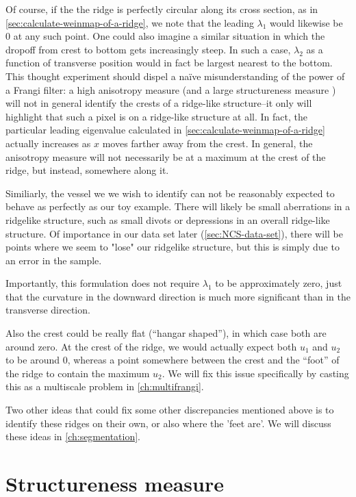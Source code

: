 Of course, if the the ridge is perfectly circular along its cross section, as in \cref{sec:calculate-weinmap-of-a-ridge}, we note that the leading  $\lambda_1$ would likewise be 0 at any such point.  One could also imagine a similar situation in which the dropoff from crest to bottom gets increasingly steep. In such a case, $\lambda_2$ as a function of transverse position would in fact be largest nearest to the bottom. This thought experiment should dispel a na\"{i}ve misunderstanding of the power of a Frangi filter: a high anisotropy measure (and a large structureness measure ) will not in general identify the crests of a ridge-like structure--it only will highlight that such a pixel is on a ridge-like structure at all. In fact, the particular leading eigenvalue calculated in \cref{sec:calculate-weinmap-of-a-ridge} actually increases as $x$ moves farther away from the crest. In general, the anisotropy measure will not necessarily be at a maximum at the crest of the ridge, but instead, somewhere along it.

Similiarly, the vessel we we wish to identify can not be reasonably expected to behave as perfectly as our toy example. There will likely be small aberrations in a ridgelike structure, such as small divots or depressions in an overall ridge-like structure. Of importance in our data set later (\cref{sec:NCS-data-set}), there will be points where we seem to "lose" our ridgelike structure,
but this is simply due to an error in the sample.

Importantly, this formulation does not require $\lambda_1$ to be approximately zero, just that the curvature in the downward direction is much more significant than in the transverse direction.

Also the crest could be really flat (``hangar shaped''), in which case both are around zero. At the crest of the ridge, we would actually expect both $u_1$ and $u_2$ to be around 0, whereas a point somewhere between the crest and the ``foot'' of the ridge to contain the maximum $u_2$. We will fix this issue specifically by casting this as a multiscale problem in \cref{ch:multifrangi}.

Two other ideas that could fix some other discrepancies mentioned above is to identify these ridges on their own, or also where the 'feet are'. We will discuss these ideas in \cref{ch:segmentation}.

\section{Structureness measure} \label{sec:frangi-structureness}

